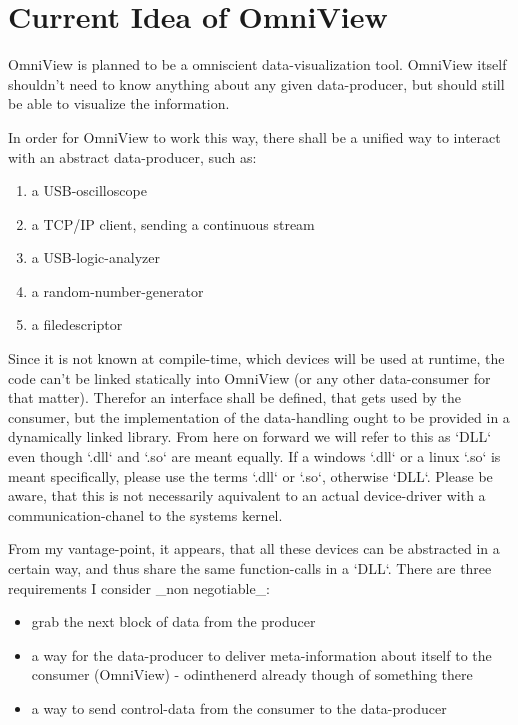 \documentclass[]{scrreprt}
\begin{document}
\chapter{Current Idea of OmniView}
OmniView is planned to be a omniscient data-visualization tool. OmniView itself shouldn't need to know anything about any given data-producer, but should still be able to visualize the information.

In order for OmniView to work this way, there shall be a unified way to interact with an abstract data-producer, such as:
\begin{enumerate}
    \item a USB-oscilloscope
    \item a TCP/IP client, sending a continuous stream
    \item a USB-logic-analyzer
    \item a random-number-generator
    \item a filedescriptor
\end{enumerate}

Since it is not known at compile-time, which devices will be used at runtime, the code can't be linked statically into OmniView (or any other data-consumer for that matter). Therefor an interface shall be defined, that gets used by the consumer, but the implementation of the data-handling ought to be provided in a dynamically linked library. From here on forward we will refer to this as `DLL` even though `.dll` and `.so` are meant equally. If a windows `.dll` or a linux `.so` is meant specifically, please use the terms `.dll` or `.so`, otherwise `DLL`. Please be aware, that this is not necessarily aquivalent to an actual device-driver with a communication-chanel to the systems kernel.

From my vantage-point, it appears, that all these devices can be abstracted in a certain way, and thus share the same function-calls in a `DLL`.
There are three requirements I consider _non negotiable_:
\begin{itemize}
    \item grab the next block of data from the producer
    \item a way for the data-producer to deliver meta-information about itself to the consumer (OmniView) - odinthenerd already though of something there
    \item a way to send control-data from the consumer to the data-producer
\end{itemize}
\end{document}
